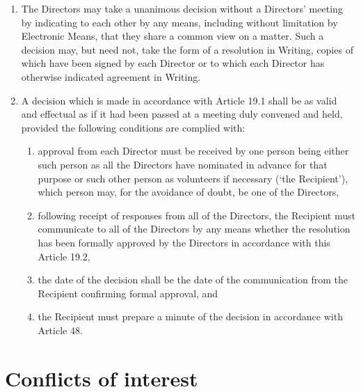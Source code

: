 \documentclass[a4paper,12pt]{article}
\begin{document}
\begin{enumerate}
  \item The Directors may take a unanimous decision without a Directors' meeting by indicating to each other by any means, including without limitation by Electronic Means, that they share a common view on a matter. Such a decision may, but need not, take the form of a resolution in Writing, copies of which have been signed by each Director or to which each Director has otherwise indicated agreement in Writing.
  \item A decision which is made in accordance with Article 19.1 shall be as valid and effectual as if it had been passed at a meeting duly convened and held, provided the following conditions are complied with:
  \begin{enumerate}
    \item approval from each Director must be received by one person being either such person as all the Directors have nominated in advance for that purpose or such other person as volunteers if necessary (`the Recipient'), which person may, for the avoidance of doubt, be one of the Directors,
    \item following receipt of responses from all of the Directors, the Recipient must communicate to all of the Directors by any means whether the resolution has been formally approved by the Directors in accordance with this Article 19.2,
    \item the date of the decision shall be the date of the communication from the Recipient confirming formal approval, and
    \item the Recipient must prepare a minute of the decision in accordance with Article 48.
  \end{enumerate}
\end{enumerate}

\section{Conflicts of interest}
\end{document}
